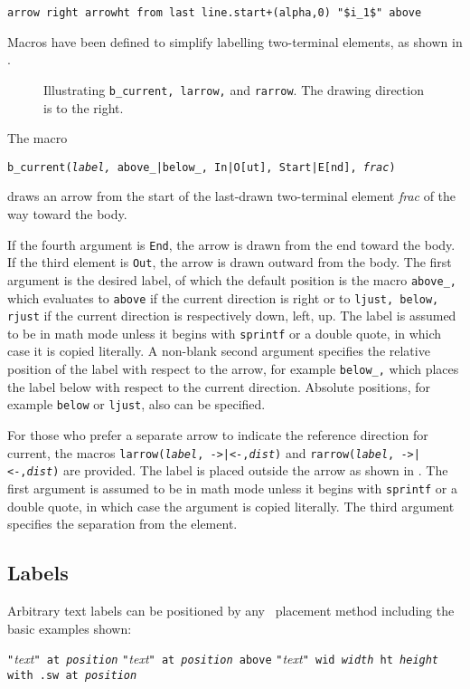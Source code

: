   \verb|arrow right arrowht from last line.start+(alpha,0) "$i_1$" above|

\enlargethispage{\baselineskip}%
Macros have been defined to simplify labelling two-terminal
elements, as shown in .
\begin{figure}[H]
   
   \caption{Illustrating {\tt b\_current, larrow,} and {\tt rarrow}.
      The drawing direction is to the right.}
   \label{currents}
   \end{figure}
The macro

   {\tt b\_current({\sl label,} above\_|below\_, In|O[ut], Start|E[nd],
   {\sl frac})}

\noindent
draws an arrow from the start of the last-drawn two-terminal element
{\sl frac} of the way toward the body.

If the fourth argument is {\tt End}, the arrow is drawn from the end
toward the body.
If the third element is {\tt Out}, the arrow is drawn outward from the body.
The first argument is the desired label, of which the default position is
the macro {\tt above\_,} which evaluates to {\tt above} if the current
direction is right or to {\tt ljust, below, rjust} if the current
direction is respectively down, left, up.  The label is assumed to be
in math mode unless it begins with {\tt sprintf} or a double quote, in which
case it is copied literally.  A non-blank second argument specifies the
relative position of the label with respect to the arrow, for example
{\tt below\_,} which places the label below with respect to the current
direction.  Absolute positions, for example {\tt below} or {\tt ljust},
also can be specified.

For those who prefer a separate arrow to indicate the reference
direction for current, the macros {\tt larrow({\sl label}, ->|<-,{\sl dist})}
and {\tt rarrow({\sl label}, ->|<-,{\sl dist})} are provided.  The label is
placed outside the arrow as shown in .
The first argument is assumed to be in math mode unless
it begins with {\tt sprintf} or a double
quote, in which case the argument is copied literally.
The third argument specifies the separation from the element.

\subsection{Labels\label{Labels:}}
   Arbitrary text labels
   can be positioned by any \pic\ placement method including the
   basic examples shown:

   {\tt "}{\sl text}{\tt" at {\sl position}}\NVL
   {\tt "}{\sl text}{\tt" at {\sl position} above}\NVL
   {\tt "}{\sl text}{\tt" wid {\sl width} ht {\sl height} 
     with .sw at {\sl position}}\NVL

